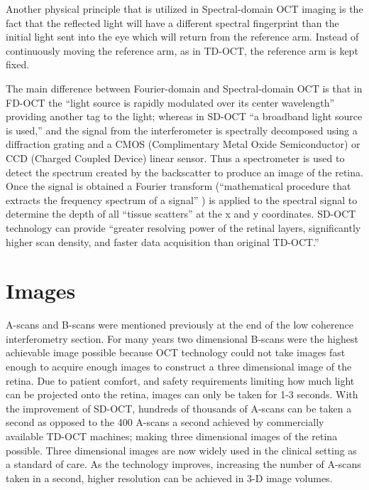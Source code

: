 
Another physical principle that is utilized in Spectral-domain OCT imaging is the fact that the reflected light will have a different spectral fingerprint than the initial light sent into the eye which will return from the reference arm.  Instead of continuously moving the reference arm, as in TD-OCT, the reference arm is kept fixed.  

The main difference between Fourier-domain and Spectral-domain OCT is that in FD-OCT the “light source is rapidly modulated over its center wavelength” \cite{} providing another tag to the light; whereas in SD-OCT “a broadband light source is used,” \cite{} and the signal from the interferometer is spectrally decomposed using a diffraction grating and a CMOS (Complimentary Metal Oxide Semiconductor) or CCD (Charged Coupled Device) linear sensor. \cite{} Thus a spectrometer is used to detect the spectrum created by the backscatter to produce an image of the retina.  Once the signal is obtained a Fourier transform (“mathematical procedure that extracts the frequency spectrum of a signal” \cite{} ) is applied to the spectral signal to determine the depth of all “tissue scatters” \cite{} at the x and y coordinates.  SD-OCT technology can provide “greater resolving power of the retinal layers, significantly higher scan density, and faster data acquisition than original TD-OCT.” \cite{}

\section{Images}
A-scans and B-scans were mentioned previously at the end of the low coherence interferometry section.  For many years two dimensional B-scans were the highest achievable image possible because OCT technology could not take images fast enough to acquire enough images to construct a three dimensional image of the retina.  Due to patient comfort, and safety requirements limiting how much light can be projected onto the retina, images can only be taken for 1-3 seconds. \cite{} With the improvement of SD-OCT, hundreds of thousands of A-scans can be taken a second as opposed to the 400 A-scans a second achieved by commercially available TD-OCT machines; making three dimensional images of the retina possible. \cite{}  Three dimensional images are now widely used in the clinical setting as a standard of care.  As the technology improves, increasing the number of A-scans taken in a second, higher resolution can be achieved in 3-D image volumes. \cite{}

